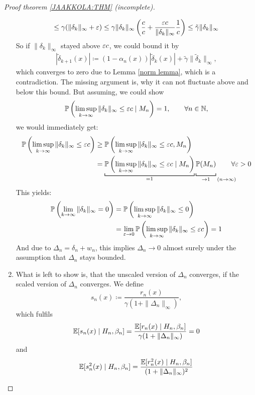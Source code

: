 \begin{proof}[Proof theorem \ref{JAAKKOLA:THM} (incomplete)]
\begin{enumerate}[label= Step \arabic*:, ref= Step \arabic*, leftmargin=0pt]
\[        \le \gamma (\|\delta_k\|_\infty + \varepsilon)
        \le \gamma \|\delta_k\|_\infty \left(
            \frac{c}{c} + \frac{\varepsilon c}{\|\delta_k\|_\infty} \frac{1}{c}
        \right)
        \le \tilde{\gamma} \|\delta_k\|_\infty
    \]
    So if \(\|\delta_k\|_\infty\) stayed above \(\varepsilon c\), we could bound it by
    \begin{align}\label{making it scale invariant}
        |\tilde{\delta}_{k+1}(x)|\coloneqq (1-\alpha_n(x))|\tilde{\delta}_k(x)|+\tilde{\gamma} \|\tilde{\delta}_k\|_\infty,
    \end{align}
    which converges to zero due to Lemma \ref{norm lemma}, which is a contradiction. The missing argument is, why it can not fluctuate above and below this bound. But assuming, we could show
    \[
        \mathbb{P}\left(\limsup_{k\to\infty} \|\delta_k\|_\infty \le \varepsilon c \mid M_n \right)=1, \qquad \forall n\in\mathbb{N},
    \]
    we would immediately get:
    \begin{align*}
        \Pr\left(\limsup_{k\to\infty} \|\delta_k\|_\infty \le \vep c\right)
        &\ge \Pr\left(\limsup_{k\to\infty} \|\delta_k\|_\infty \le \vep c , M_n \right)\\
        &=\underbracket[0.7pt]{
            \Pr\left(\limsup_{k\to\infty} \|\delta_k\|_\infty \le \vep c \mid M_n \right)
        }_{=1} \underbracket[0.7pt]{\vphantom{\sup_{k}}\Pr(M_n)}_{
            \to 1 \mathrlap{\quad (n\to \infty)}
        } \qquad \forall \vep >0
    \end{align*}
    This yields:
    \begin{align*}
        \mathbb{P}\left(\lim_{k\to\infty} \|\delta_k\|_\infty = 0 \right)
        &=\mathbb{P}\left(\limsup_{k\to\infty} \|\delta_k\|_\infty \le 0 \right)\\
        &=\lim_{\varepsilon\to 0} \mathbb{P}\left(\limsup_{k\to\infty} \|\delta_k\|_\infty \le \varepsilon c \right)=1
    \end{align*}
    And due to \(\Delta_n=\delta_n+w_n\), this implies \(\Delta_n\to 0\) almost surely under the assumption that \(\Delta_n\) stays bounded. 
    \item What is left to show is, that the unscaled version of \(\Delta_n\) converges, if the scaled version of \(\Delta_n\) converges. We define
    \[
        s_n(x)\coloneqq \frac{r_n(x)}{\gamma(1+\|\Delta_n\|_\infty)},
    \]
    which fulfils
    \[
        \mathbb{E}[s_n(x) \mid H_n,\beta_n]=\frac{\mathbb{E}[r_n(x)\mid H_n,\beta_n]}{\gamma (1+\|\Delta_n\|_\infty)}=0
    \]
    and
    \[
        \mathbb{E}[s_n^2(x)\mid H_n,\beta_n]
        =\frac{\mathbb{E}[r_n^2(x)\mid H_n,\beta_n]}{(1+\|\Delta_n\|_\infty)^2}
\]
\end{enumerate}
\end{proof}

